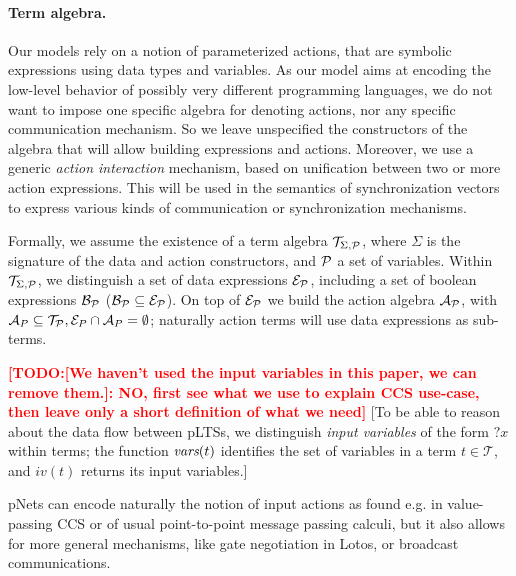 \documentclass{lncs/llncs}
\newcommand{\TODO}[1]{\textcolor{red}{\textbf{[TODO:#1]}}}
\newcommand{\QIN}[1]{\textcolor{airforceblue}{#1}}
\def\AlgT{\mathcal{T}}
\begin{document}
\paragraph*{Term algebra.}
Our models rely on a notion of parameterized actions, that are
symbolic expressions using data types and variables. As our model aims
at encoding the low-level behavior of possibly very different
programming languages, we do not want to impose one specific algebra
for denoting actions, nor any specific communication mechanism. So we
leave unspecified the constructors of the algebra that will allow building
expressions and actions. Moreover, we use a generic {\em action interaction}
mechanism, based on unification between two or more action
expressions. This will be used in the semantics of synchronization
vectors to express various kinds of communication or synchronization mechanisms.

\def\Talg{\mathcal{T}_{\Sigma,\P}}
Formally, we assume the existence of a term algebra $\Talg$,
where $\Sigma$ is the signature of the data and action constructors,
and $\P$ a set of variables. Within $\Talg$, we distinguish a set of
data expressions $\mathcal{E}_\P$, including a set of boolean
expressions $\mathcal{B}_{\P}$ ($\mathcal{B}_{\P}\subseteq\mathcal{E}_\P$).
On top of $\mathcal{E}_\P$ we build the action algebra
$\mathcal{A}_\P$, with $\mathcal{A}_P\subseteq\mathcal{T}_\P,
\mathcal{E}_P\cap\mathcal{A}_P=\emptyset$;
naturally action terms will use data expressions as sub-terms.

\TODO{[We haven't used the input variables in this paper, we can remove them.]: NO, first see what we use to explain CCS use-case, then leave only a short definition of what we need}
\QIN{[To be able to reason about the data flow between pLTSs, we
distinguish \emph{input variables} of the form $?x$ within terms; the function
$\vars(t)$ identifies the set of variables in a term
$t\in\AlgT$, and $iv(t)$ returns its input variables.]}


pNets can encode naturally the notion of input actions as found e.g. in value-passing CCS
\cite{Milner89} or of usual point-to-point message passing calculi, but it also allows
for more general mechanisms, like gate negotiation in Lotos, or broadcast
communications.

\end{document}
